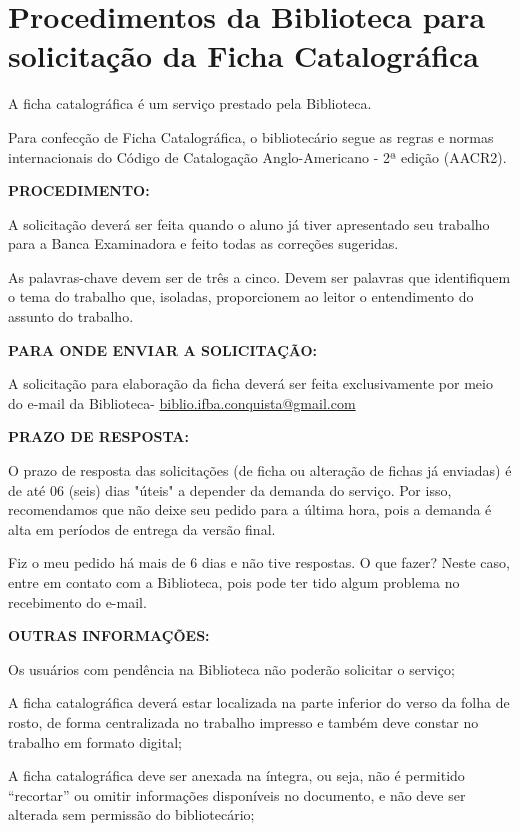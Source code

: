 \pagebreak\clearpage\newpage

\section{Procedimentos da Biblioteca para solicitação da Ficha Catalográfica}
\label{sec:Biblioteca}

A ficha catalográfica é um serviço prestado pela Biblioteca. 

Para confecção de Ficha Catalográfica, o bibliotecário segue as regras e normas
internacionais do Código de Catalogação Anglo-Americano - 2ª edição (AACR2).

{\bf PROCEDIMENTO:}

A solicitação deverá ser feita quando o aluno já tiver apresentado seu trabalho para a Banca Examinadora e feito todas as correções sugeridas.

As palavras-chave devem ser de três a cinco. Devem ser palavras que identifiquem o tema do trabalho que, isoladas, proporcionem ao leitor o entendimento do assunto do trabalho.

{\bf PARA ONDE ENVIAR A SOLICITAÇÃO:}

A solicitação para elaboração da ficha deverá ser feita exclusivamente por meio do e-mail da Biblioteca- \url{biblio.ifba.conquista@gmail.com}

{\bf PRAZO DE RESPOSTA:}

O prazo de resposta das solicitações (de ficha ou alteração de fichas já enviadas) é de até 06 (seis) dias "úteis" a depender da demanda do serviço. Por isso, recomendamos que não deixe seu pedido para a última hora, pois a demanda é alta em períodos de entrega da versão final.

Fiz o meu pedido há mais de 6 dias e não tive respostas. O que fazer? Neste caso, entre em contato com a Biblioteca, pois pode ter tido algum problema no recebimento do e-mail.

{\bf OUTRAS INFORMAÇÕES:}

Os usuários com pendência na Biblioteca não poderão solicitar o serviço;

A ficha catalográfica deverá estar localizada na parte inferior do verso da folha de rosto, de forma centralizada no trabalho impresso e também deve constar no trabalho em formato digital;

A ficha catalográfica deve ser anexada na íntegra, ou seja, não é permitido ``recortar'' ou omitir informações disponíveis no documento, e não deve ser alterada sem permissão do bibliotecário;

